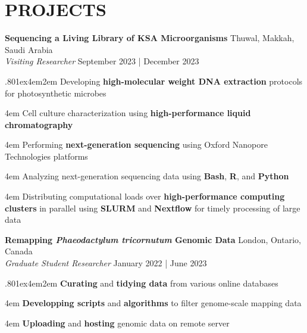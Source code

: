 \documentclass[a4paper,9pt]{extarticle}
\begin{document}
\section*{PROJECTS}
\noindent
\begin{minipage}{1\textwidth}
\setlength{\parindent}{15pt} %
	\noindent
	\textbf{Sequencing a Living Library of KSA Microorganisms} \hfill Thuwal, Makkah, Saudi Arabia\\ %
	\textit{Visiting Researcher}
	\hfill September 2023 | December 2023 \par%
	{\hsize.80\linewidth\parskip1ex\hangindent4em\parindent2em 
	\setlength{\parskip}{0pt} %
		Developing \textbf{high-molecular weight DNA extraction} protocols for photosynthetic microbes\par
		\hangindent4em
		Cell culture characterization using \textbf{high-performance liquid chromatography}\par		
		\hangindent4em
		Performing \textbf{next-generation sequencing} using Oxford Nanopore Technologies platforms\par
		\hangindent4em
		Analyzing next-generation sequencing data using \textbf{Bash}, \textbf{R}, and \textbf{Python}\par
		\hangindent4em
		Distributing computational loads over \textbf{high-performance computing clusters} in parallel using \textbf{SLURM} and \textbf{Nextflow} for timely processing of large data\par}
\end{minipage}
\vspace{\parskip}

\noindent
\begin{minipage}{1\textwidth}
\setlength{\parindent}{15pt} %
	\noindent
	\textbf{Remapping \textit{Phaeodactylum tricornutum} Genomic Data} \hfill London, Ontario, Canada\\ %
	\textit{Graduate Student Researcher}
	\hfill January 2022 | June 2023 \par %
	{\hsize.80\linewidth\parskip1ex\hangindent4em\parindent2em 
	\setlength{\parskip}{0pt} %
		\textbf{Curating} and \textbf{tidying data} from various online databases\par
		\hangindent4em
		\textbf{Developping scripts} and \textbf{algorithms} to filter genome-scale mapping data \par
		\hangindent4em
		\textbf{Uploading} and \textbf{hosting} genomic data on remote server\par}
\end{minipage}
\vspace{\parskip}
\end{document}
